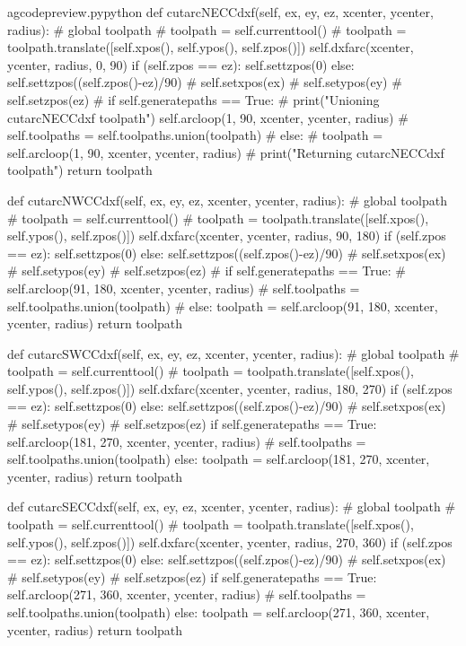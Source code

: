 \documentclass{ltxdoc}
\begin{document}
\lstset{firstnumber=\thegcpy}
\begin{writecode}{a}{gcodepreview.py}{python}
    def cutarcNECCdxf(self, ex, ey, ez, xcenter, ycenter, radius):
#        global toolpath
#        toolpath = self.currenttool()
#        toolpath = toolpath.translate([self.xpos(), self.ypos(), self.zpos()])
        self.dxfarc(xcenter, ycenter, radius, 0, 90)
        if (self.zpos == ez):
            self.settzpos(0)
        else:         
            self.settzpos((self.zpos()-ez)/90)
#        self.setxpos(ex)
#        self.setypos(ey)
#        self.setzpos(ez)
#        if self.generatepaths == True:
#            print("Unioning cutarcNECCdxf toolpath")
        self.arcloop(1, 90, xcenter, ycenter, radius)
#            self.toolpaths = self.toolpaths.union(toolpath)
#        else:
#            toolpath = self.arcloop(1, 90, xcenter, ycenter, radius)
#            print("Returning cutarcNECCdxf toolpath")
        return toolpath

    def cutarcNWCCdxf(self, ex, ey, ez, xcenter, ycenter, radius):
#        global toolpath
#        toolpath = self.currenttool()
#        toolpath = toolpath.translate([self.xpos(), self.ypos(), self.zpos()])
        self.dxfarc(xcenter, ycenter, radius, 90, 180)
        if (self.zpos == ez):
            self.settzpos(0)
        else:         
            self.settzpos((self.zpos()-ez)/90)
#        self.setxpos(ex)
#        self.setypos(ey)
#        self.setzpos(ez)
#        if self.generatepaths == True:
#            self.arcloop(91, 180, xcenter, ycenter, radius)
#            self.toolpaths = self.toolpaths.union(toolpath)
#        else:
        toolpath = self.arcloop(91, 180, xcenter, ycenter, radius)
        return toolpath

    def cutarcSWCCdxf(self, ex, ey, ez, xcenter, ycenter, radius):
#        global toolpath
#        toolpath = self.currenttool()
#        toolpath = toolpath.translate([self.xpos(), self.ypos(), self.zpos()])
        self.dxfarc(xcenter, ycenter, radius, 180, 270)
        if (self.zpos == ez):
            self.settzpos(0)
        else:         
            self.settzpos((self.zpos()-ez)/90)
#        self.setxpos(ex)
#        self.setypos(ey)
#        self.setzpos(ez)
        if self.generatepaths == True:
            self.arcloop(181, 270, xcenter, ycenter, radius)
#            self.toolpaths = self.toolpaths.union(toolpath)
        else:
            toolpath = self.arcloop(181, 270, xcenter, ycenter, radius)
            return toolpath

    def cutarcSECCdxf(self, ex, ey, ez, xcenter, ycenter, radius):
#        global toolpath
#        toolpath = self.currenttool()
#        toolpath = toolpath.translate([self.xpos(), self.ypos(), self.zpos()])
        self.dxfarc(xcenter, ycenter, radius, 270, 360)
        if (self.zpos == ez):
            self.settzpos(0)
        else:         
            self.settzpos((self.zpos()-ez)/90)
#        self.setxpos(ex)
#        self.setypos(ey)
#        self.setzpos(ez)
        if self.generatepaths == True:
            self.arcloop(271, 360, xcenter, ycenter, radius)
#            self.toolpaths = self.toolpaths.union(toolpath)
        else:
            toolpath = self.arcloop(271, 360, xcenter, ycenter, radius)
            return toolpath


\end{writecode}
\end{document}
